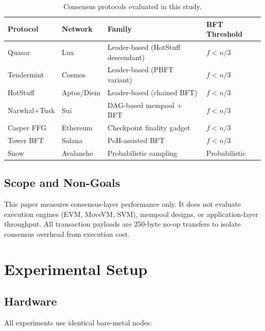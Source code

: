 \documentclass[11pt]{article}
\begin{document}
\begin{table}[h]
\centering
\small
\begin{tabular}{@{}llll@{}}
\toprule
\textbf{Protocol} & \textbf{Network} & \textbf{Family} & \textbf{BFT Threshold} \\
\midrule
Quasar        & Lux         & Leader-based (HotStuff descendant) & $f < n/3$ \\
Tendermint    & Cosmos      & Leader-based (PBFT variant)        & $f < n/3$ \\
HotStuff      & Aptos/Diem  & Leader-based (chained BFT)         & $f < n/3$ \\
Narwhal+Tusk  & Sui         & DAG-based mempool + BFT            & $f < n/3$ \\
Casper FFG    & Ethereum    & Checkpoint finality gadget         & $f < n/3$ \\
Tower BFT     & Solana      & PoH-assisted BFT                   & $f < n/3$ \\
Snow          & Avalanche   & Probabilistic sampling             & Probabilistic \\
\bottomrule
\end{tabular}
\caption{Consensus protocols evaluated in this study.}
\label{tab:protocols}
\end{table}

\subsection{Scope and Non-Goals}

This paper measures consensus-layer performance only. It does not evaluate execution
engines (EVM, MoveVM, SVM), mempool designs, or application-layer throughput. All
transaction payloads are 250-byte no-op transfers to isolate consensus overhead from
execution cost.

\section{Experimental Setup}

\subsection{Hardware}

All experiments use identical bare-metal nodes:
\end{document}
